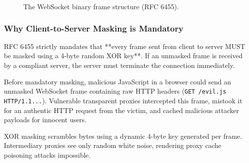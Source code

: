 \begin{figure}[htbp]
\centering
{}
\caption{The WebSocket binary frame structure (RFC 6455).}
\label{fig:websocket-frame}
\end{figure}

\subsubsection{Why Client-to-Server Masking is Mandatory}
RFC 6455 strictly mandates that **every frame sent from client to server MUST be masked using a 4-byte random XOR key**. If an unmasked frame is received by a compliant server, the server must terminate the connection immediately.

\begin{underthehoodbox}
Before mandatory masking, malicious JavaScript in a browser could send an unmasked WebSocket frame containing raw HTTP headers (\texttt{GET /evil.js HTTP/1.1...}). Vulnerable transparent proxies intercepted this frame, mistook it for an authentic HTTP request from the victim, and cached malicious attacker payloads for innocent users. 

XOR masking scrambles bytes using a dynamic 4-byte key generated per frame. Intermediary proxies see only random white noise, rendering proxy cache poisoning attacks impossible.
\end{underthehoodbox}

